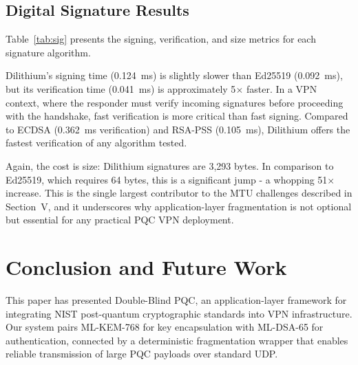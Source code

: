 \documentclass[10pt, conference, letterpaper]{IEEEtran}
\begin{document}
\subsection{Digital Signature Results}
Table~\ref{tab:sig} presents the signing, verification, and size metrics for each signature algorithm.

\begin{table}[hbt!]
\centering
\caption{Digital Signature Performance (mean of 25 iterations)}
\label{tab:sig}
\end{table}

Dilithium's signing time (0.124~ms) is slightly slower than Ed25519 (0.092~ms), but its verification time (0.041~ms) is approximately 5$\times$ faster. In a VPN context, where the responder must verify incoming signatures before proceeding with the handshake, fast verification is more critical than fast signing. Compared to ECDSA (0.362~ms verification) and RSA-PSS (0.105~ms), Dilithium offers the fastest verification of any algorithm tested.

Again, the cost is size: Dilithium signatures are 3,293 bytes. In comparison to Ed25519, which requires 64 bytes, this is a significant jump - a whopping 51$\times$ increase. This is the single largest contributor to the MTU challenges described in Section~V, and it underscores why application-layer fragmentation is not optional but essential for any practical PQC VPN deployment.

\section{Conclusion and Future Work}
This paper has presented Double-Blind PQC, an application-layer framework for integrating NIST post-quantum cryptographic standards into VPN infrastructure. Our system pairs ML-KEM-768 for key encapsulation with ML-DSA-65 for authentication, connected by a deterministic fragmentation wrapper that enables reliable transmission of large PQC payloads over standard UDP.
\end{document}
